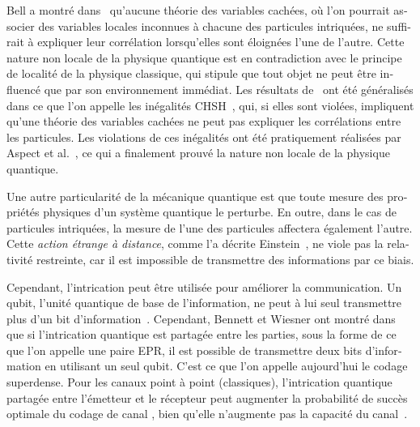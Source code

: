 \begin{otherlanguage}{french}
Bell a montré dans~\cite{Bell64} qu'aucune théorie des variables cachées, où l'on pourrait associer des variables locales inconnues à chacune des particules intriquées, ne suffirait à expliquer leur corrélation lorsqu'elles sont éloignées l'une de l'autre. Cette nature non locale de la physique quantique est en contradiction avec le principe de localité de la physique classique, qui stipule que tout objet ne peut être influencé que par son environnement immédiat. Les résultats de~\cite{Bell64} ont été généralisés dans ce que l'on appelle les inégalités CHSH~\cite{CHSH69}, qui, si elles sont violées, impliquent qu'une théorie des variables cachées ne peut pas expliquer les corrélations entre les particules. Les violations de ces inégalités ont été pratiquement réalisées par Aspect et al.~\cite{ADG82}, ce qui a finalement prouvé la nature non locale de la physique quantique.

Une autre particularité de la mécanique quantique est que toute mesure des propriétés physiques d'un système quantique le perturbe. En outre, dans le cas de particules intriquées, la mesure de l'une des particules affectera également l'autre. Cette \emph{action étrange à distance}, comme l'a décrite Einstein~\cite{Born71}, ne viole pas la relativité restreinte, car il est impossible de transmettre des informations par ce biais.

Cependant, l'intrication peut être utilisée pour améliorer la communication. Un qubit, l'unité quantique de base de l'information, ne peut à lui seul transmettre plus d'un bit d'information~\cite{Holevo73}. Cependant, Bennett et Wiesner ont montré dans~\cite{BW92} que si l'intrication quantique est partagée entre les parties, sous la forme de ce que l'on appelle une paire EPR, il est possible de transmettre deux bits d'information en utilisant un seul qubit. C'est ce que l'on appelle aujourd'hui le codage superdense. Pour les canaux point à point (classiques), l'intrication quantique partagée entre l'émetteur et le récepteur peut augmenter la probabilité de succès optimale du codage de canal \cite{CLMW10,PLMKR11}, bien qu'elle n'augmente pas la capacité du canal~\cite{BBCJPW93,BSST99}.


\end{otherlanguage}
